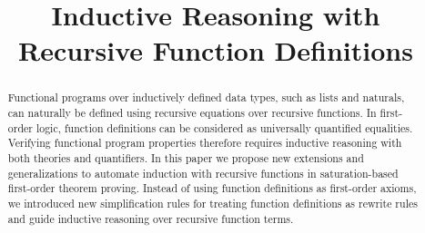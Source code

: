 \documentclass[conference]{IEEEtran}
\theoremstyle{definition}
\begin{document}
	\title{Inductive Reasoning with Recursive Function Definitions}


	\author{
	}

	\maketitle

	\begin{abstract}
Functional programs over inductively defined data types, such as lists and naturals,
can naturally be defined using recursive equations over recursive functions.
In first-order logic,  function
definitions can be considered as universally quantified equalities.
Verifying functional program properties therefore
 requires inductive
reasoning with both theories and quantifiers.
In this paper we propose new  extensions and
generalizations to automate induction with recursive functions in saturation-based first-order theorem proving.
Instead of using function definitions as first-order axioms, we introduced new simplification rules for
treating function definitions as rewrite rules and guide inductive reasoning over recursive function terms.
	\end{abstract}





	\IEEEpeerreviewmaketitle
\end{document}

